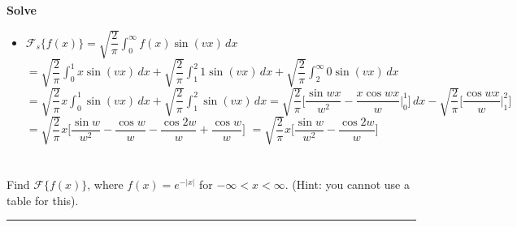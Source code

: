 \documentclass[10pt]{article}
\begin{document}
\noindent
\textbf{Solve}  \\

\begin{itemize}
    \item $ \displaystyle \mathcal{F}_s\{f(x)\} = \sqrt{\dfrac{2}{\pi}} \int_{0}^{\infty} f(x) \sin(vx) \,dx $
    \subitem  $ \displaystyle = \sqrt{\dfrac{2}{\pi}} \int_{0}^{1} x \sin(vx) \,dx + \sqrt{\dfrac{2}{\pi}} \int_{1}^{2} 1 \sin(vx) \,dx + \sqrt{\dfrac{2}{\pi}} \int_{2}^{\infty} 0 \sin(vx) \,dx $
    \subitem  $ \displaystyle = \sqrt{\dfrac{2}{\pi}}x \int_{0}^{1} \sin(vx) \,dx + \sqrt{\dfrac{2}{\pi}} \int_{1}^{2} \sin(vx) \,dx 
    = \sqrt{\dfrac{2}{\pi}} \Big[\dfrac{\sin{wx}}{w^2} - \dfrac{x\cos{wx}}{w} \Big|_{0}^{1} \Big] \,dx - \sqrt{\dfrac{2}{\pi}} \Big[\dfrac{\cos{wx}}{w} \Big|_{1}^{2} \Big] $
    \subitem  $ \displaystyle = \sqrt{\dfrac{2}{\pi}}x \Big[\dfrac{\sin{w}}{w^2} - \dfrac{\cos{w}}{w} - \dfrac{\cos{2w}}{w} + \dfrac{\cos{w}}{w} \Big] $
    \subitem  $ \displaystyle = \sqrt{\dfrac{2}{\pi}}x \Big[\dfrac{\sin{w}}{w^2} - \dfrac{\cos{2w}}{w} \Big] $
\end{itemize}

\newpage

\section{\underline{}}
\label{sec: Problem 3}
\noindent
Find $ \mathcal{F}\{f(x)\} $, where $ f(x)=e^{-|x|} $ for $ -\infty < x < \infty $. (Hint: you cannot use a table for this). \\
\vspace{2.5mm}
\hrule 

\vspace{7.5mm}
\end{document}
